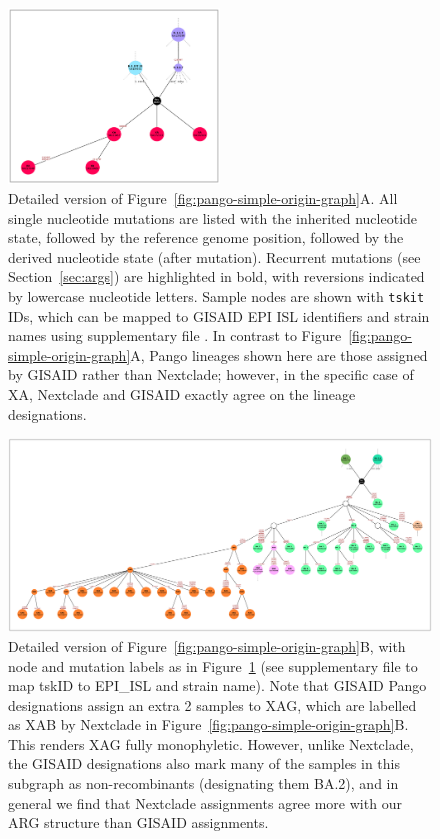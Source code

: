 \documentclass{article}
\begin{document}
\begin{figure} \centering
\includegraphics[width=0.5\textwidth]{figures/Pango_XA_gisaid_large_graph.pdf}
\caption{\label{fig:pango_XA_gisaid_graph}
Detailed version of Figure~\ref{fig:pango-simple-origin-graph}A. All single nucleotide mutations are listed
with the inherited nucleotide state, followed by the reference genome position, followed by the derived
nucleotide state (after mutation). Recurrent mutations (see Section~\ref{sec:args}) are highlighted in bold,
with reversions indicated by lowercase nucleotide letters. Sample nodes are shown with \texttt{tskit} IDs,
which can be mapped to GISAID EPI ISL identifiers and strain names using supplementary file \protect{}. In contrast to
Figure~\ref{fig:pango-simple-origin-graph}A, Pango lineages shown here are those assigned by GISAID rather
than Nextclade; however, in the specific case of XA, Nextclade and GISAID exactly agree on the lineage designations.
}
\end{figure}

\begin{figure} \centering
\includegraphics[width=\textwidth]{figures/Pango_XAG_gisaid_large_graph.pdf}
\caption{\label{fig:pango_XAG_gisaid_graph}
Detailed version of Figure~\ref{fig:pango-simple-origin-graph}B, with node and mutation labels as in
Figure~\ref{fig:pango_XA_gisaid_graph} (see supplementary file \protect{}
to map tskID to EPI\_ISL and strain name).
Note that GISAID Pango designations assign an extra 2 samples to XAG, which are labelled as XAB
by Nextclade in Figure~\ref{fig:pango-simple-origin-graph}B. This renders XAG fully monophyletic.
However, unlike Nextclade, the GISAID designations also mark many of the samples in this subgraph
as non-recombinants (designating them BA.2), and in general we find that Nextclade assignments
agree more with our ARG structure than GISAID assignments.
}
\end{figure}
\end{document}

